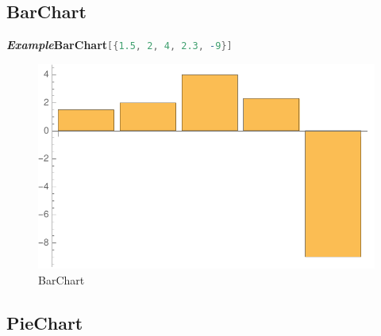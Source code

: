 \documentclass[a4paper]{book}
\begin{document}
\subsection{BarChart}
\label{subsec:label}

\noindent\emph{\textbf{Example}}\quad\textbf{BarChart}\lstinline[language=Mathematica]|[{1.5, 2, 4, 2.3, -9}]|



\begin{figure}[H]
  \centering
  \includegraphics[width=0.45\linewidth]{figures/BarChart}
  \caption{BarChart}
\end{figure}

\subsection{PieChart}
\label{subsec:label}
\end{document}
